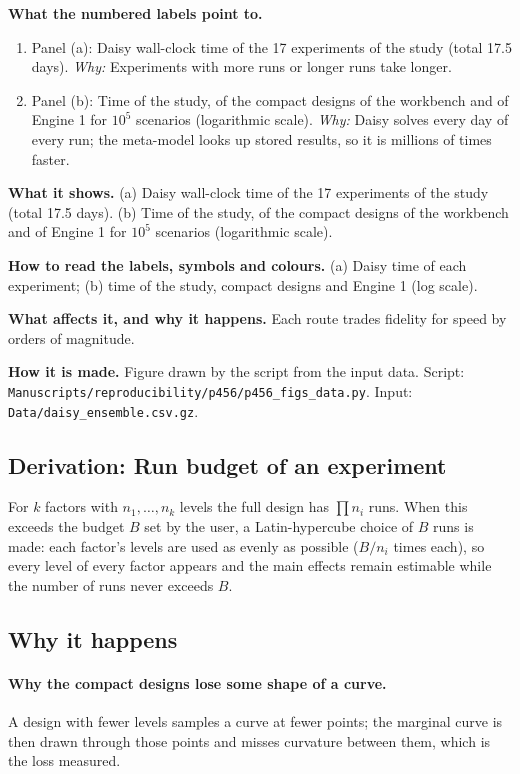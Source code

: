 \textbf{What the numbered labels point to.}
\begin{enumerate}[nosep,label=\protect\circled{\arabic*}]
\item Panel (a): Daisy wall-clock time of the 17 experiments of the study (total 17.5 days). \emph{Why:} Experiments with more runs or longer runs take longer.
\item Panel (b): Time of the study, of the compact designs of the workbench and of Engine 1 for $10^5$ scenarios (logarithmic scale). \emph{Why:} Daisy solves every day of every run; the meta-model looks up stored results, so it is millions of times faster.
\end{enumerate}

\textbf{What it shows.} (a) Daisy wall-clock time of the 17 experiments of the study (total 17.5 days). (b) Time of the study, of the compact designs of the workbench and of Engine 1 for $10^5$ scenarios (logarithmic scale).

\textbf{How to read the labels, symbols and colours.} (a) Daisy time of each experiment; (b) time of the study, compact designs and Engine 1 (log scale).

\textbf{What affects it, and why it happens.} Each route trades fidelity for speed by orders of magnitude.

\textbf{How it is made.} Figure drawn by the script from the input data. Script: \nolinkurl{Manuscripts/reproducibility/p456/p456_figs_data.py}. Input: \nolinkurl{Data/daisy_ensemble.csv.gz}.


\subsection{Derivation: Run budget of an experiment}\label{der:s3:9}
For $k$ factors with $n_1,\dots,n_k$ levels the full design has $\prod n_i$ runs. When this exceeds the budget $B$ set by the user, a Latin-hypercube choice of $B$ runs is made: each factor's levels are used as evenly as possible ($B/n_i$ times each), so every level of every factor appears and the main effects remain estimable while the number of runs never exceeds $B$.


\subsection{Why it happens}
\paragraph{Why the compact designs lose some shape of a curve.} A design with fewer levels samples a curve at fewer points; the marginal curve is then drawn through those points and misses curvature between them, which is the loss measured.

